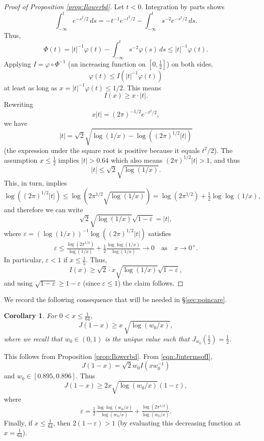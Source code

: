 \documentclass[12pt]{amsart}
\theoremstyle{plain}
\newtheorem{cor}[thm]{Corollary}
\theoremstyle{definition}
\theoremstyle{remark}
\numberwithin{equation}{section}
\begin{document}
\begin{proof}[Proof of Proposition \ref{prop:Ilowerbd}]
Let $t<0$. Integration by parts shows
\[ \int_{-\infty}^t e^{-s^2/2}\,ds 
= -t^{-1} e^{-t^2/2} - \int_{-\infty}^t s^{-2} e^{-s^2/2}\,ds. \]
Thus,
\[ \Phi(t) = |t|^{-1} \varphi(t) - \int_{-\infty}^t s^{-2} \varphi(s)\,ds \le |t|^{-1} \varphi(t). \]
Applying $I=\varphi\circ\Phi^{-1}$ (an increasing function on $[0,\tfrac12]$) on both sides,
\[ \varphi(t) \le I(|t|^{-1} \varphi(t)) \]
at least as long as $x=|t|^{-1}\varphi(t)\le 1/2$. 
This means
\[ I(x)\ge x\cdot |t|. \]
Rewriting
\[ x|t| = (2\pi)^{-1/2} e^{-t^2/2}, \]
we have
\[ |t| = \sqrt{2} \sqrt{\log(1/x)-
\log((2\pi)^{1/2}|t|)}  \]
(the expression under the square root is positive because it equals $t^2/2$). The assumption $x\le \frac12$ implies $|t|>0.64$ which also means $(2\pi)^{1/2}|t|>1$, and thus
\[ |t|\le \sqrt{2}\sqrt{\log(1/x)}. \]
This, in turn, implies
\[\log((2\pi)^{1/2}|t|)\le \log(2 \pi^{1/2} \sqrt{\log(1/x)}) = \log(2\pi^{1/2}) + \tfrac12 \log\log(1/x),  \]
and therefore we can write
\[ \sqrt{2} \sqrt{\log(1/x)} \sqrt{1-\varepsilon} = |t|,\]
where $\varepsilon = (\log(1/x))^{-1} \log((2\pi)^{1/2}|t|)$
satisfies
\[ \varepsilon \le \tfrac{\log(2\pi^{1/2})}{\log(1/x)} + \tfrac12 \tfrac{\log\log(1/x)}{\log(1/x)}\to 0\quad\text{as}\quad x\to 0^+. \]
In particular, $\varepsilon<1$ if $x\le \frac15$.
Thus,
\[ I(x)\ge \sqrt{2}\cdot x\sqrt{\log(1/x)} \sqrt{1-\varepsilon}, \]
and using $\sqrt{1-\varepsilon} \ge 1 - \varepsilon$ (since $\varepsilon\le 1$) the claim follows.
\end{proof}

We record the following consequence that will be needed in \S \ref{sec:poincare}.
\begin{cor}\label{prop:Jlowerbd}
For $0<x\le \tfrac1{64}$,
\[ J(1-x)\ge x\,\sqrt{\log(w_0/x)}, \]
where we recall that $w_0\in (0,1)$ is the unique value such that $J_{w_0}(\frac12)=\frac12$.
\end{cor}
This follows from Proposition \ref{prop:Ilowerbd}. From \eqref{eqn:JintermsofI}, 
\[J(1-x)=\sqrt{2} w_0 I(x w_0^{-1})\]
and $w_0\in [0.895, 0.896]$. 
Thus
\begin{equation}\label{eqn:Jlowerbd}
J(1-x) \ge 2 x \sqrt{\log(w_0/x)} (1- \varepsilon),
\end{equation}
where
\[  \varepsilon = \tfrac12 \tfrac{\log\log(w_0/x)}{\log(w_0/x)} + \tfrac{\log(2\pi^{1/2})}{\log(w_0/x)}. \]
Finally, if $x\le \frac1{64}$, then $2 (1-\varepsilon)> 1$
(by evaluating this decreasing function at $x=\frac1{64}$).
\end{document}
